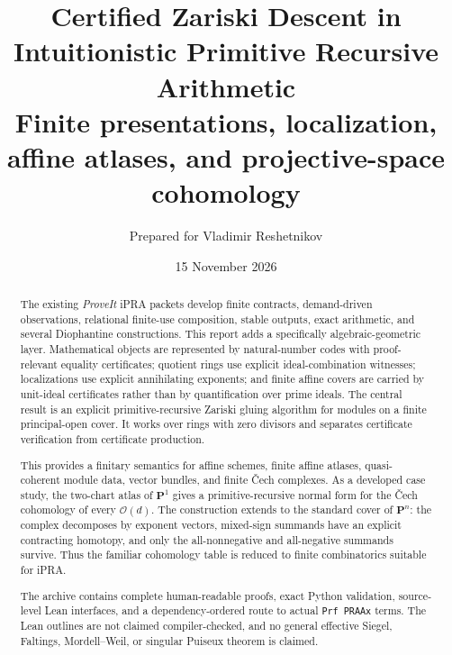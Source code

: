 \documentclass[11pt]{article}
\title{\textbf{Certified Zariski Descent in Intuitionistic Primitive Recursive Arithmetic}\\[0.5em]
\large Finite presentations, localization, affine atlases, and projective-space cohomology}
\author{Prepared for Vladimir Reshetnikov}
\date{15 November 2026}
\newcommand{\cO}{\mathcal O}
\newcommand{\code}[1]{\nolinkurl{#1}}
\begin{document}
\maketitle

\begin{abstract}
The existing \emph{ProveIt} iPRA packets develop finite contracts, demand-driven observations,
relational finite-use composition, stable outputs, exact arithmetic, and several Diophantine
constructions.  This report adds a specifically algebraic-geometric layer.  Mathematical objects
are represented by natural-number codes with proof-relevant equality certificates; quotient rings
use explicit ideal-combination witnesses; localizations use explicit annihilating exponents; and
finite affine covers are carried by unit-ideal certificates rather than by quantification over prime
ideals.  The central result is an explicit primitive-recursive Zariski gluing algorithm for modules
on a finite principal-open cover.  It works over rings with zero divisors and separates certificate
verification from certificate production.

This provides a finitary semantics for affine schemes, finite affine atlases, quasi-coherent module
data, vector bundles, and finite \v{C}ech complexes.  As a developed case study, the two-chart atlas
of $\mathbf P^1$ gives a primitive-recursive normal form for the \v{C}ech cohomology of every
$\cO(d)$.  The construction extends to the standard cover of $\mathbf P^n$: the complex decomposes
by exponent vectors, mixed-sign summands have an explicit contracting homotopy, and only the
all-nonnegative and all-negative summands survive.  Thus the familiar cohomology table is reduced
to finite combinatorics suitable for iPRA.

The archive contains complete human-readable proofs, exact Python validation, source-level Lean
interfaces, and a dependency-ordered route to actual \code{Prf PRAAx} terms.  The Lean outlines
are not claimed compiler-checked, and no general effective Siegel, Faltings, Mordell--Weil, or
singular Puiseux theorem is claimed.
\end{abstract}

\tableofcontents
\newpage

















\end{document}
